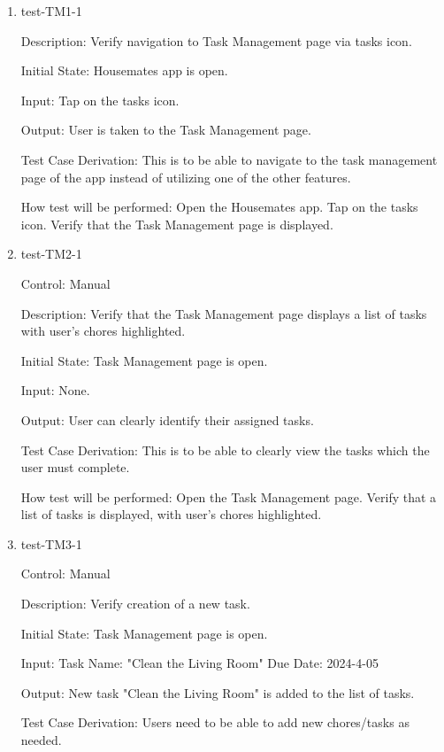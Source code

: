 \documentclass[12pt, titlepage]{article}
\begin{document}
\begin{enumerate}

\item{test-TM1-1\\}

Description: Verify navigation to Task Management page via tasks icon.
					
Initial State: Housemates app is open.
					
Input: Tap on the tasks icon.
					
Output: User is taken to the Task Management page.

Test Case Derivation: This is to be able to navigate to the task management page of the app instead of utilizing one of the other features.
					
How test will be performed: 
Open the Housemates app.
Tap on the tasks icon.
Verify that the Task Management page is displayed.
					
\item{test-TM2-1\\}

Control: Manual

Description: Verify that the Task Management page displays a list of tasks with user's chores highlighted.
					
Initial State: Task Management page is open.
					
Input: None.
					
Output: User can clearly identify their assigned tasks.

Test Case Derivation: This is to be able to clearly view the tasks which the user must complete.

How test will be performed: 
Open the Task Management page.
Verify that a list of tasks is displayed, with user's chores highlighted.

\item{test-TM3-1\\}

Control: Manual

Description: Verify creation of a new task.
					
Initial State: Task Management page is open.
					
Input: Task Name: "Clean the Living Room"
Due Date: 2024-4-05
					
Output: New task "Clean the Living Room" is added to the list of tasks.

Test Case Derivation: Users need to be able to add new chores/tasks as needed.


\end{enumerate}
\end{document}
